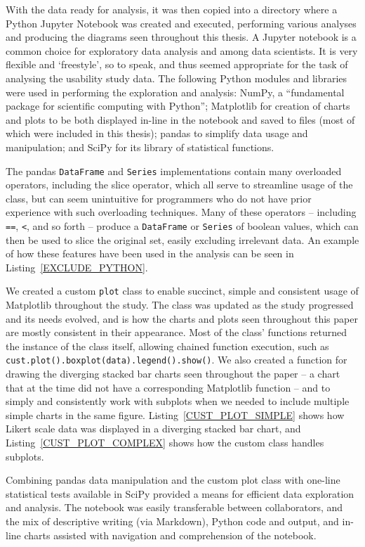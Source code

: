   With the data ready for analysis, it was then copied into a directory where a Python Jupyter Notebook was created and executed, performing various analyses and producing the diagrams seen throughout this thesis. A Jupyter notebook is a common choice for exploratory data analysis and among data scientists. It is very flexible and `freestyle', so to speak, and thus seemed appropriate for the task of analysing the usability study data. The following Python modules and libraries were used in performing the exploration and analysis: NumPy, a ``fundamental package for scientific computing with Python''; Matplotlib for creation of charts and plots to be both displayed in-line in the notebook and saved to files (most of which were included in this thesis); pandas to simplify data usage and manipulation; and SciPy for its library of statistical functions.
  
  The pandas \texttt{DataFrame} and \texttt{Series} implementations contain many overloaded operators, including the slice operator, which all serve to streamline usage of the class, but can seem unintuitive for programmers who do not have prior experience with such overloading techniques. Many of these operators -- including \texttt{==}, \texttt{\textless}, and so forth -- produce a \texttt{DataFrame} or \texttt{Series} of boolean values, which can then be used to slice the original set, easily excluding irrelevant data. An example of how these features have been used in the analysis can be seen in Listing~\ref{EXCLUDE_PYTHON}.
  
  We created a custom \texttt{plot} class to enable succinct, simple and consistent usage of Matplotlib throughout the study. The class was updated as the study progressed and its needs evolved, and is how the charts and plots seen throughout this paper are mostly consistent in their appearance. Most of the class' functions returned the instance of the class itself, allowing chained function execution, such as \texttt{cust.plot().boxplot(data).legend().show()}. We also created a function for drawing the diverging stacked bar charts seen throughout the paper -- a chart that at the time did not have a corresponding Matplotlib function -- and to simply and consistently work with subplots when we needed to include multiple simple charts in the same figure. Listing~\ref{CUST_PLOT_SIMPLE} shows how Likert scale data was displayed in a diverging stacked bar chart, and Listing~\ref{CUST_PLOT_COMPLEX} shows how the custom class handles subplots.
  
  Combining pandas data manipulation and the custom plot class with one-line statistical tests available in SciPy provided a means for efficient data exploration and analysis. The notebook was easily transferable between collaborators, and the mix of descriptive writing (via Markdown), Python code and output, and in-line charts assisted with navigation and comprehension of the notebook.
  
